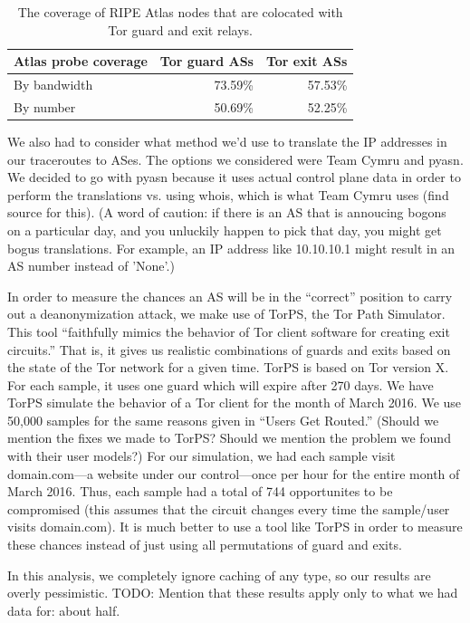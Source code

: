 \begin{table}[t]
	\caption{The coverage of RIPE Atlas nodes that are colocated with Tor guard and exit
	relays.}
	\label{tab:atlas-coverage}
	\centering
	\begin{tabular}{l|r r}
	\toprule
	\textbf{Atlas probe coverage} & \textbf{Tor guard ASs} & \textbf{Tor exit ASs} \\
	\midrule
	By bandwidth & 73.59\% & 57.53\% \\
	By number & 50.69\% & 52.25\% \\
	\bottomrule
	\end{tabular}
\end{table}

We also had to consider what method we'd use to translate the IP addresses in our 
traceroutes to ASes. The options we considered were Team Cymru and pyasn. We decided to 
go with pyasn because it uses actual control plane data in order to perform the 
translations vs. using whois, which is what Team Cymru uses (find source for this). 
(A word of caution: if there is an AS that is annoucing bogons on a particular day, and 
you unluckily happen to pick that day, you might get bogus translations. For example, an 
IP address like 10.10.10.1 might result in an AS number instead of 'None'.)

In order to measure the chances an AS will be in the ``correct'' position to carry out a
deanonymization attack, we make use of TorPS, the Tor Path Simulator. This tool 
``faithfully mimics the behavior of Tor client software for creating exit circuits.''
That is, it gives us realistic combinations of guards and exits based on the state of the 
Tor network for a given time. TorPS is based on Tor version X. For each sample, it uses 
one guard which will expire after 270 days. We have TorPS simulate the behavior of a Tor 
client for the month of March 2016. We use 50,000 samples for the same reasons given in
``Users Get Routed.'' (Should we mention the fixes we made to TorPS? Should we mention 
the problem we found with their user models?) For our simulation, we had each sample 
visit domain.com---a website under our control---once per hour for the entire
month of March 2016. Thus, each sample had a total of 744 opportunites to be
compromised (this assumes that the circuit changes every time the sample/user
visits domain.com). It is much better to use a tool like TorPS in order to
measure these chances instead of just using all permutations of guard and
exits.

In this analysis, we completely ignore caching of any type, so our results are overly 
pessimistic. TODO: Mention that these results apply only to what we had data for: about 
half.

